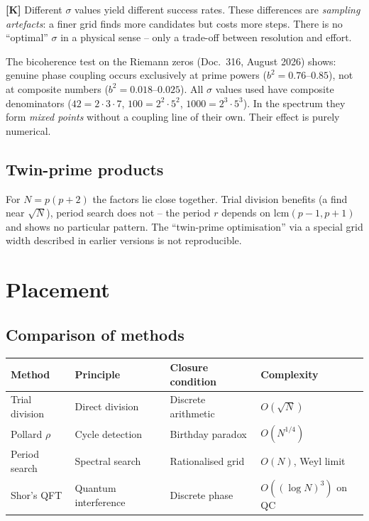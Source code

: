 \textbf{[K]} Different $\sigma$ values yield different success rates. These
differences are \emph{sampling artefacts}: a finer grid finds more candidates
but costs more steps. There is no \enquote{optimal} $\sigma$ in a physical
sense -- only a trade-off between resolution and effort.

\begin{keyresult}
The bicoherence test on the Riemann zeros (Doc.~316, August 2026) shows: genuine
phase coupling occurs exclusively at prime powers ($b^2 = 0.76$--$0.85$), not at
composite numbers ($b^2 = 0.018$--$0.025$). All $\sigma$ values used have
composite denominators ($42 = 2\cdot3\cdot7$, $100 = 2^2\cdot5^2$,
$1000 = 2^3\cdot5^3$). In the spectrum they form \emph{mixed points} without a
coupling line of their own. Their effect is purely numerical.
\end{keyresult}

\subsection{Twin-prime products}

For $N = p(p+2)$ the factors lie close together. Trial division benefits (a
find near $\sqrt{N}$), period search does not -- the period $r$ depends on
$\mathrm{lcm}(p-1,p+1)$ and shows no particular pattern. The
\enquote{twin-prime optimisation} via a special grid width described in earlier
versions is not reproducible.

\section{Placement}

\subsection{Comparison of methods}

\begin{center}
\begin{tabular}{llll}
\toprule
Method & Principle & Closure condition & Complexity \\
\midrule
Trial division & Direct division & Discrete arithmetic & $O(\sqrt{N})$ \\
Pollard $\rho$ & Cycle detection & Birthday paradox & $O(N^{1/4})$ \\
Period search & Spectral search & Rationalised grid & $O(N)$, Weyl limit \\
Shor's QFT & Quantum interference & Discrete phase & $O((\log N)^3)$ on QC \\
\bottomrule
\end{tabular}
\end{center}

